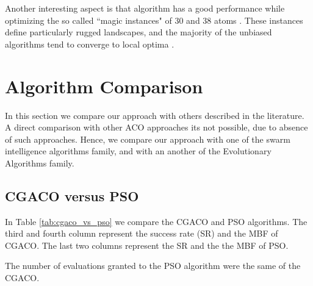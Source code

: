 	Another interesting aspect is that algorithm has a good performance while optimizing the so called ``magic instances" of 30 and 38 atoms \cite{doye97}. These instances define particularly rugged landscapes, and the majority of the unbiased algorithms tend to converge to local optima \cite{doye97, grosso07}.
	
	\section{Algorithm Comparison}
	In this section we compare our approach with others described in the literature. A direct comparison with other ACO approaches its not possible, due to absence of such approaches. Hence, we compare our approach with one of the swarm intelligence algorithms family, and with an another of the Evolutionary Algorithms family.
	\subsection{CGACO versus PSO}
	In Table \ref{tab:cgaco_vs_pso} we compare the CGACO and PSO algorithms. The third and fourth column represent the success rate (SR) and the MBF of CGACO. The last two columns represent the SR and the the MBF of PSO. 
	
	The number of evaluations granted to the PSO algorithm were the same of the CGACO. 
	

